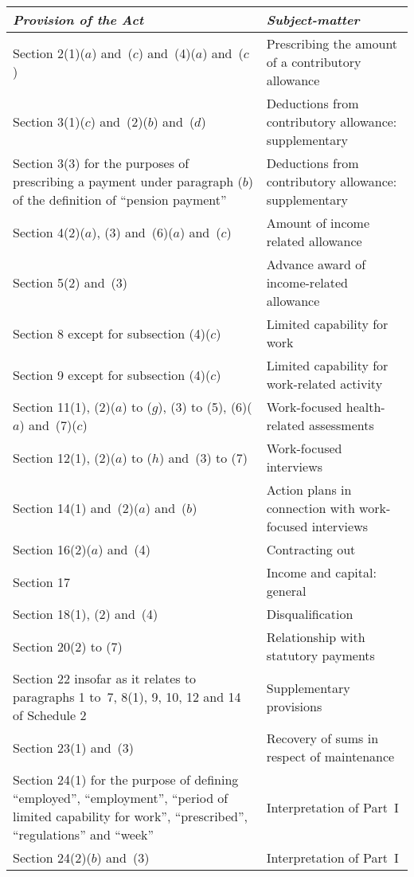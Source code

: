 \documentclass[12pt,a4paper]{article}
\begin{document}
\begin{longtable}{p{236.03096pt}p{129.95471pt}}
\hline
\itshape Provision of the Act 	& \itshape Subject-matter\\
\hline
\endhead
\hline
\endlastfoot
Section 2(1)($a$)  and~($c$)  and~(4)($a$)  and~($c$) 	&Prescribing the amount of a contributory allowance\\
Section 3(1)($c$)  and~(2)($b$)  and~($d$) 	&Deductions from contributory allowance: supplementary\\
Section 3(3) for the purposes of prescribing a payment under paragraph ($b$)  of the definition of “pension payment”	&Deductions from contributory allowance: supplementary\\
Section 4(2)($a$), (3) and~(6)($a$)  and~($c$) 	&Amount of income related allowance\\
Section 5(2) and~(3)	&Advance award of income-related allowance\\
Section 8 except for subsection (4)($c$) &	Limited capability for work\\
Section 9 except for subsection (4)($c$) &	Limited capability for work-related activity\\
Section 11(1), (2)($a$)  to ($g$), (3) to (5), (6)($a$)  and~(7)($c$) 	&Work-focused health-related assessments\\
Section 12(1), (2)($a$)  to ($h$)  and~(3) to (7)	&Work-focused interviews\\
Section 14(1) and~(2)($a$)  and~($b$) 	&Action plans in connection with work-focused interviews\\
Section 16(2)($a$)  and~(4)	&Contracting out\\
Section 17	&Income and capital: general\\
Section 18(1), (2) and~(4)	&Disqualification\\
Section 20(2) to (7)	&Relationship with statutory payments\\
Section 22 insofar as it relates to paragraphs 1 to~7, 8(1), 9, 10, 12 and 14 of Schedule 2	&Supplementary provisions\\
Section 23(1) and~(3)	&Recovery of sums in respect of maintenance\\
Section 24(1) for the purpose of defining “employed”, “employment”, “period of limited capability for work”, “prescribed”, “regulations” and “week”	&Interpretation of Part~I\\
Section 24(2)($b$)  and~(3)	&Interpretation of Part~I\\

\end{longtable}
\end{document}
